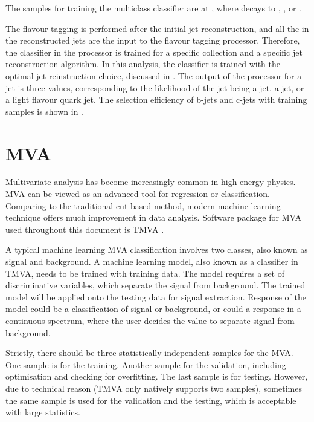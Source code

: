 The samples for training the multiclass classifier are \HepProcess{\Pep \Pem \to \PZ \APnu \Pnu} at , where \PZ decays to \HepProcess{\Pbottom\APbottom}, \HepProcess{\Pcharm\APcharm}, or \HepProcess{\Pup\APup/\Pdown\APdown/\Pstrange\APstrange}.

The flavour tagging is performed after the initial jet reconstruction, and all the \PFOs in the reconstructed jets are the input to the \lcfiplus flavour tagging processor. Therefore, the classifier in the \lcfiplus processor is trained for a specific \PFO collection and a specific jet reconstruction algorithm. In this analysis, the classifier is trained with the optimal jet reinstruction choice, discussed in . The output of the processor for a jet is three values, corresponding to the likelihood of the jet being a \Pbottom jet, a \Pcharm jet, or a light flavour quark jet.  The selection efficiency of b-jets and c-jets with training samples is shown in .

\section{MVA}
Multivariate analysis  has become increasingly common in high energy physics. MVA can be viewed as an advanced tool for regression or classification. Comparing to the traditional cut based method, modern machine learning technique offers much improvement in data analysis. Software package for MVA used throughout this document is TMVA \cite{Hocker:2007ht}.

A typical machine learning MVA classification involves two classes, also known as signal and background. A machine learning model, also known as a classifier in TMVA, needs to be trained with training data. The model requires a set of discriminative variables, which separate the signal from background. The trained model will be applied onto the testing data for signal extraction. Response of the model could be a classification of signal or background, or could  a response in a continuous spectrum, where the user decides the value to separate signal from background.

Strictly, there should be three statistically independent samples for the MVA. One sample is for the training. Another sample for the validation, including optimisation and checking for overfitting. The last sample is for testing. However, due to technical reason (TMVA only natively supports two samples), sometimes the same sample is used for the validation and the testing, which is acceptable with large statistics.

